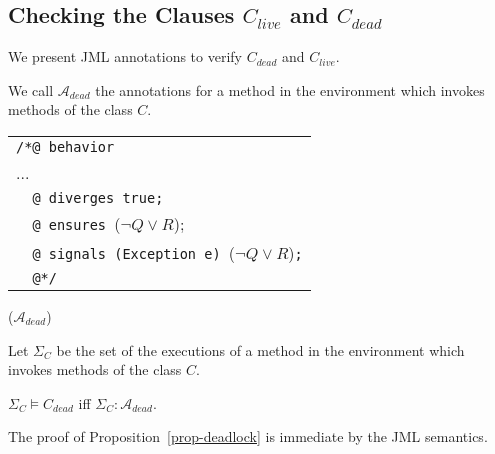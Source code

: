 \subsection{Checking the Clauses $C_{live}$ and $C_{dead}$} 
\label{sec-checking}




We present JML annotations to verify $C_{dead}$ and $C_{live}$.

We call $\mathcal{A}_{dead}$ the annotations for a method in the environment which invokes methods of the class $C$.\\ 
\begin{tabular}{l}
\hspace{8em}\verb+/*@ behavior+\\
\hspace{8em}...\\
\hspace{8em}\verb+  @ diverges true;+\\
\hspace{8em}\verb+  @ ensures +($\neg Q \vee R$);\\
\hspace{8em}\verb+  @ signals (Exception e) +($\neg Q \vee R$)\verb+;+\\
\hspace{8em}\verb+  @*/+
\end{tabular} \hspace{4em} ($\mathcal{A}_{dead}$)


\begin{proposition}
\label{prop-deadlock}
Let $\Sigma_{C}$ be the set of the executions of a method in the
environment which invokes methods of the class $C$. 

$\Sigma_{C} \models C_{dead}$ iff
$\Sigma_C : \mathcal{A}_{dead}$.
\end{proposition}
The proof of Proposition~\ref{prop-deadlock} is immediate by the 
JML semantics. %

